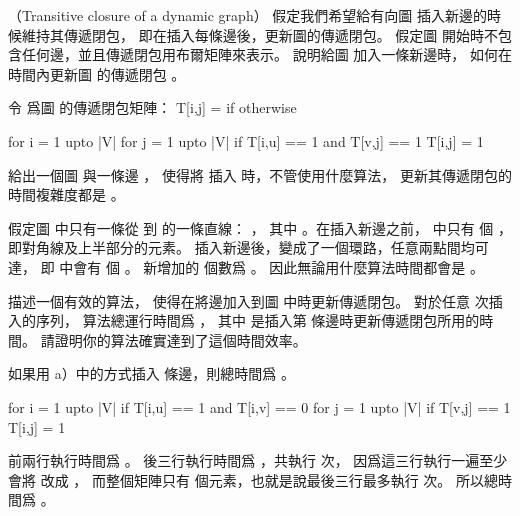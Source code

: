 \startsubject[
  title={Problems},
]

\startPROBLEM
（Transitive closure of a dynamic graph）
假定我們希望給有向圖  插入新邊的時候維持其傳遞閉包，
即在插入每條邊後，更新圖的傳遞閉包。
假定圖  開始時不包含任何邊，並且傳遞閉包用布爾矩陣來表示。
\startigBase[a]\startitem
說明給圖  加入一條新邊時，
如何在  時間內更新圖  的傳遞閉包 。
\stopitem\stopigBase

\startANSWER
令  爲圖  的傳遞閉包矩陣：
\startformula
T[i,j] = \startcases
{} \NC if  \NR
{} \NC otherwise \NR
\stopcases
\stopformula

\startCLRS
for i = 1 upto |V|
	for j = 1 upto |V|
		if T[i,u] == 1 and T[v,j] == 1
			T[i,j] = 1
\stopCLRS

\stopANSWER

\startigBase[continue]\startitem
給出一個圖  與一條邊 ，
使得將  插入  時，不管使用什麼算法，
更新其傳遞閉包的時間複雜度都是 。
\stopitem\stopigBase

\startANSWER
假定圖  中只有一條從  到  的一條直線：
 ，
其中 。在插入新邊之前，  中只有  個 ，
即對角線及上半部分的元素。
插入新邊後，變成了一個環路，任意兩點間均可達，
即  中會有  個 。
新增加的  個數爲 。
因此無論用什麼算法時間都會是 。
\stopANSWER

\startigBase[continue]\startitem
描述一個有效的算法，
使得在將邊加入到圖  中時更新傳遞閉包。
對於任意  次插入的序列，
算法總運行時間爲 ，
其中  是插入第  條邊時更新傳遞閉包所用的時間。
請證明你的算法確實達到了這個時間效率。
\stopitem\stopigBase

\startANSWER
如果用 a）中的方式插入  條邊，則總時間爲 。

\startCLRS
for i = 1 upto |V|
	if T[i,u] == 1 and T[i,v] == 0
		for j = 1 upto |V|
			if T[v,j] == 1
				T[i,j] = 1
\stopCLRS

前兩行執行時間爲 。
後三行執行時間爲 ，共執行  次，
因爲這三行執行一遍至少會將  改成 ，
而整個矩陣只有  個元素，也就是說最後三行最多執行  次。
所以總時間爲 。
\stopANSWER

\stopPROBLEM

